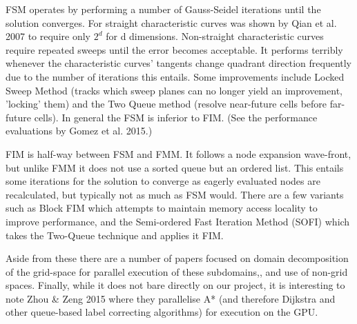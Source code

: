 \documentclass[11pt]{article}       %
\begin{document}
FSM operates by performing a number of Gauss-Seidel iterations until the solution converges. For straight characteristic curves was shown by Qian et al. 2007 to require only $ 2^{d} $ for d dimensions. Non-straight characteristic curves require repeated sweeps until the error becomes acceptable. It performs terribly whenever the characteristic curves' tangents change quadrant direction frequently due to the number of iterations this entails. Some improvements include Locked Sweep Method (tracks which sweep planes can no longer yield an improvement, 'locking' them) and the Two Queue method (resolve near-future cells before far-future cells).\cite{bak2010some} In general the FSM is inferior to FIM. (See the performance evaluations by Gomez et al. 2015.\cite{gomez2015fast})

FIM is half-way between FSM and FMM. It follows a node expansion wave-front, but unlike FMM it does not use a sorted queue but an ordered list. This entails some iterations for the solution to converge as eagerly evaluated nodes are recalculated, but typically not as much as FSM would. There are a few variants such as Block FIM\cite{jeong2008fast} which attempts to maintain memory access locality to improve performance, and the Semi-ordered Fast Iteration Method (SOFI)\cite{gillberg201rg2011} which takes the Two-Queue technique and applies it FIM.

Aside from these there are a number of papers focused on domain decomposition of the grid-space for parallel execution of these subdomains,\cite{detrixhe2016hybrid}\cite{hong2016multi}\cite{weinbub2016shared}, and use of non-grid spaces\cite{mirzadeh2016parallel}. Finally, while it does not bare directly on our project, it is interesting to note Zhou \& Zeng 2015 where they parallelise A* (and therefore Dijkstra and other queue-based label correcting algorithms) for execution on the GPU.\cite{zhou2015massively}
\end{document}
